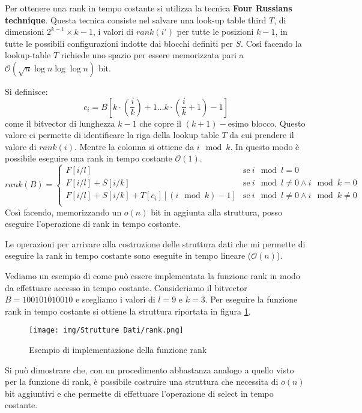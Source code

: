 Per ottenere una rank in tempo costante si utilizza la tecnica \textbf{Four
    Russians technique}. Questa tecnica consiste nel salvare una look-up table
third $T$, di dimensioni $2^{k - 1} \times k - 1$, i valori di $rank(i')$
per tutte le posizioni $k - 1$, in tutte le possibili configurazioni indotte dai
blocchi definiti per $S$. Così facendo la lookup-table $T$ richiede uno spazio
per essere memorizzata pari a $\mathcal{O}(\sqrt{n} \log n \log \log n)$ bit.

Si definisce:
\begin{equation}
    c_i = B[k \cdot (\frac{i}{k}) + 1 \dots k \cdot (\frac{i}{k} + 1) - 1]
\end{equation}
come il bitvector di lunghezza $k - 1$ che copre il $(k + 1)-$esimo blocco. Questo
valore ci permette di identificare la riga della lookup table $T$ da cui prendere
il valore di $rank(i)$. Mentre la colonna si ottiene da $i \mod k$. In questo
modo è possibile eseguire una rank in tempo costante $\mathcal{O}(1)$.
\begin{equation}
    rank(B) = \begin{cases}
        F[i/l]                                   & \text{se} \ i \mod l = 0    \\
        F[i/l] + S[i/k]                          & \text{se} \ i \mod l \neq 0
        \land i \mod k = 0                                                     \\
        F[i/l] + S[i/k] + T[c_i][(i \mod k) - 1] & \text{se} \ i \mod l \neq 0
        \land i \mod k \neq 0                                                  \\
    \end{cases}
\end{equation}
Così facendo, memorizzando un $o(n)$ bit in aggiunta alla struttura, posso
eseguire l'operazione di rank in tempo costante.
\begin{nota}
    Le operazioni per arrivare alla costruzione delle struttura dati che mi
    permette di eseguire la rank in tempo costante sono eseguite in tempo lineare
    ($\mathcal{O}(n)$).
\end{nota}
\begin{esempio}
    Vediamo un esempio di come può essere implementata la funzione rank in modo
    da effettuare accesso in tempo costante. Consideriamo il bitvector
    $B = 100101010010$ e scegliamo i valori di $l = 9$ e $k = 3$. Per eseguire
    la funzione rank in tempo costante si ottiene la struttura riportata in
    figura \ref{fig:rank}.
    \begin{figure}[!ht]
        \centering
        \texttt{[image: img/Strutture Dati/rank.png]}
        \caption{Esempio di implementazione della funzione rank}
        \label{fig:rank}
    \end{figure}
\end{esempio}
\begin{osservazione}
    Si può dimostrare che, con un procedimento abbastanza analogo a quello visto
    per la funzione di rank, è possibile costruire una struttura che necessita di
    $o(n)$ bit aggiuntivi e che permette di effettuare l'operazione di select in
    tempo costante.
\end{osservazione}

